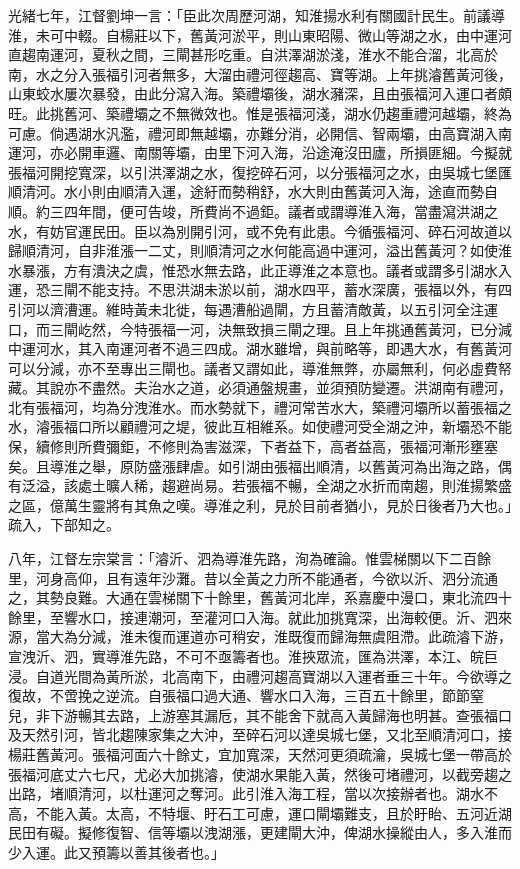 \begin{pinyinscope}
光緒七年，江督劉坤一言：「臣此次周歷河湖，知淮揚水利有關國計民生。前議導淮，未可中輟。自楊莊以下，舊黃河淤平，則山東昭陽、微山等湖之水，由中運河直趨南運河，夏秋之間，三閘甚形吃重。自洪澤湖淤淺，淮水不能合溜，北高於南，水之分入張福引河者無多，大溜由禮河徑趨高、寶等湖。上年挑濬舊黃河後，山東蛟水屢次暴發，由此分瀉入海。築禮壩後，湖水瀦深，且由張福河入運口者頗旺。此挑舊河、築禮壩之不無微效也。惟是張福河淺，湖水仍趨重禮河越壩，終為可慮。倘遇湖水汎濫，禮河即無越壩，亦難分消，必開信、智兩壩，由高寶湖入南運河，亦必開車邏、南關等壩，由里下河入海，沿途淹沒田廬，所損匪細。今擬就張福河開挖寬深，以引洪澤湖之水，復挖碎石河，以分張福河之水，由吳城七堡匯順清河。水小則由順清入運，途紆而勢稍舒，水大則由舊黃河入海，途直而勢自順。約三四年間，便可告竣，所費尚不過鉅。議者或謂導淮入海，當盡瀉洪湖之水，有妨官運民田。臣以為別開引河，或不免有此患。今循張福河、碎石河故道以歸順清河，自非淮漲一二丈，則順清河之水何能高過中運河，溢出舊黃河？如使淮水暴漲，方有潰決之虞，惟恐水無去路，此正導淮之本意也。議者或謂多引湖水入運，恐三閘不能支持。不思洪湖未淤以前，湖水四平，蓄水深廣，張福以外，有四引河以濟漕運。維時黃未北徙，每遇漕船過閘，方且蓄清敵黃，以五引河全注運口，而三閘屹然，今特張福一河，決無致損三閘之理。且上年挑通舊黃河，已分減中運河水，其入南運河者不過三四成。湖水雖增，與前略等，即遇大水，有舊黃河可以分減，亦不至專出三閘也。議者又謂如此，導淮無弊，亦屬無利，何必虛費帑藏。其說亦不盡然。夫治水之道，必須通盤規畫，並須預防變遷。洪湖南有禮河，北有張福河，均為分洩淮水。而水勢就下，禮河常苦水大，築禮河壩所以蓄張福之水，濬張福口所以顧禮河之堤，彼此互相維系。如使禮河受全湖之沖，新壩恐不能保，續修則所費彌鉅，不修則為害滋深，下者益下，高者益高，張福河漸形壅塞矣。且導淮之舉，原防盛漲肆虐。如引湖由張福出順清，以舊黃河為出海之路，偶有泛溢，該處土曠人稀，趨避尚易。若張福不暢，全湖之水折而南趨，則淮揚繁盛之區，億萬生靈將有其魚之嘆。導淮之利，見於目前者猶小，見於日後者乃大也。」疏入，下部知之。

八年，江督左宗棠言：「濬沂、泗為導淮先路，洵為確論。惟雲梯關以下二百餘里，河身高仰，且有遠年沙灘。昔以全黃之力所不能通者，今欲以沂、泗分流通之，其勢良難。大通在雲梯關下十餘里，舊黃河北岸，系嘉慶中漫口，東北流四十餘里，至響水口，接連潮河，至灌河口入海。就此加挑寬深，出海較便。沂、泗來源，當大為分減，淮未復而運道亦可稍安，淮既復而歸海無虞阻滯。此疏濬下游，宣洩沂、泗，實導淮先路，不可不亟籌者也。淮挾眾流，匯為洪澤，本江、皖巨浸。自道光間為黃所淤，北高南下，由禮河趨高寶湖以入運者垂三十年。今欲導之復故，不啻挽之逆流。自張福口過大通、響水口入海，三百五十餘里，節節窒兒，非下游暢其去路，上游塞其漏卮，其不能舍下就高入黃歸海也明甚。查張福口及天然引河，皆北趨陳家集之大沖，至碎石河以達吳城七堡，又北至順清河口，接楊莊舊黃河。張福河面六十餘丈，宜加寬深，天然河更須疏瀹，吳城七堡一帶高於張福河底丈六七尺，尤必大加挑濬，使湖水果能入黃，然後可堵禮河，以截旁趨之出路，堵順清河，以杜運河之奪河。此引淮入海工程，當以次接辦者也。湖水不高，不能入黃。太高，不特堰、盱石工可慮，運口閘壩難支，且於盱眙、五河近湖民田有礙。擬修復智、信等壩以洩湖漲，更建閘大沖，俾湖水操縱由人，多入淮而少入運。此又預籌以善其後者也。」


\end{pinyinscope}
